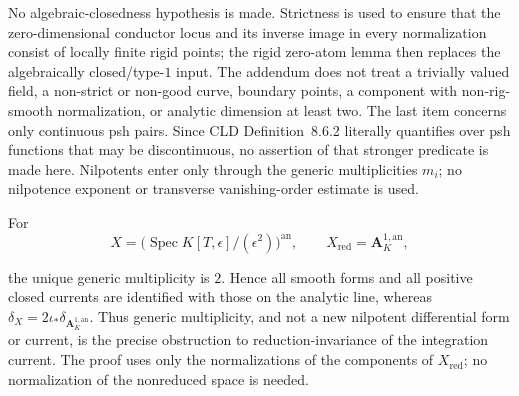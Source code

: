 \begin{remark}
\label{rem:p21p3-nr-scope}
No algebraic-closedness hypothesis is made.  Strictness is used
to ensure that the zero-dimensional conductor locus and its inverse image
in every normalization consist of locally finite rigid points; the rigid
zero-atom lemma then replaces the algebraically closed/type-\(1\) input.
The addendum does not treat a trivially valued field, a non-strict or
non-good curve, boundary points, a component with non-rig-smooth
normalization, or analytic dimension at least two.  The last item concerns
only continuous psh pairs.  Since CLD Definition~8.6.2 literally
quantifies over psh functions that may be discontinuous, no assertion of
that stronger predicate is made here.  Nilpotents enter only through the
generic multiplicities \(m_i\); no nilpotence exponent or transverse
vanishing-order estimate is used.
\end{remark}

\begin{samepage}
\begin{remark}
\label{rem:p21p3-nr-double-line}
For
\[
 X=\bigl(\operatorname{Spec}K[T,\epsilon]/(\epsilon^2)\bigr)^{\mathrm{an}},
 \qquad X_{\mathrm{red}}=\mathbf A_K^{1,\mathrm{an}},
\]

the unique generic multiplicity is \(2\).  Hence all smooth forms and all
positive closed currents are identified with those on the analytic line,
whereas
\(\delta_X=2\iota_*\delta_{\mathbf A_K^{1,\mathrm{an}}}\).
Thus generic multiplicity, and not a new nilpotent differential form or
current, is the precise obstruction to reduction-invariance of the
integration current.  The proof uses only the normalizations of the
components of \(X_{\mathrm{red}}\); no normalization of the nonreduced
space is needed.
\end{remark}
\end{samepage}
